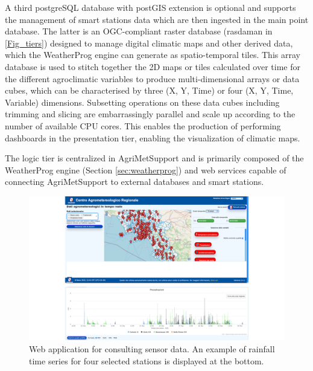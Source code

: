 \documentclass[authoryear,preprint,review,12pt]{elsarticle}
\begin{document}
A third postgreSQL database with postGIS extension is optional and supports the management of smart stations data which are then ingested in the main point database.
The latter is an OGC-compliant raster database (rasdaman in \cref{Fig_tiers}) designed to manage digital climatic maps and other derived data, which the WeatherProg engine can generate as spatio-temporal tiles.
This array database is used to stitch together the 2D maps or tiles calculated over time for the different agroclimatic variables to produce multi-dimensional arrays or data cubes, which can be  characterised by three (X, Y, Time) or four (X, Y, Time, Variable) dimensions.
Subsetting operations on these data cubes including trimming and slicing are embarrassingly parallel and scale up according to the number of available CPU cores.
This enables the production of performing dashboards in the presentation tier, enabling the visualization of climatic maps.

The logic tier is centralized in Agri\-Met\-Support and is primarily composed of the WeatherProg engine (Section \ref{sec:weatherprog}) and web services capable of connecting Agri\-Met\-Support to external databases and smart stations.

\begin{figure}[!t] %
	\centering %
	\includegraphics[angle=0,scale=.4,trim=0cm 0cm 0cm 0cm,clip]{figures/Fig03_SensorDataConsultingApp.png}
	\caption{ Web application for consulting sensor data. 
              An example of rainfall time series for four selected stations is displayed at the bottom.}
	\label{Fig_webapp}
\end{figure}
\end{document}

